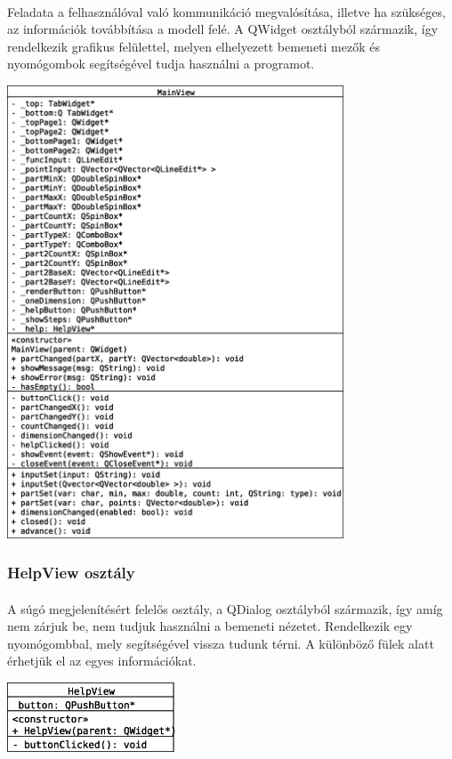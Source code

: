 \documentclass[12pt]{report}
\begin{document}
\paragraph{}
Feladata a felhasználóval való kommunikáció megvalósítása, illetve ha szükséges, az információk továbbítása a modell felé. A QWidget osztályból származik, így rendelkezik grafikus felülettel, melyen elhelyezett bemeneti mezők és nyomógombok segítségével tudja használni a programot.
\begin{center}
\includegraphics[width=10cm]{pics/uml/MainView}
\end{center}

\subsubsection{HelpView osztály}
\paragraph{}
A súgó megjelenítésért felelős osztály, a QDialog osztályból származik, így amíg nem zárjuk be, nem tudjuk használni a bemeneti nézetet. Rendelkezik egy nyomógombbal, mely segítségével vissza tudunk térni. A különböző fülek alatt érhetjük el az egyes információkat.
\begin{center}
\includegraphics[width=5cm]{pics/uml/HelpView}
\end{center}
\end{document}
